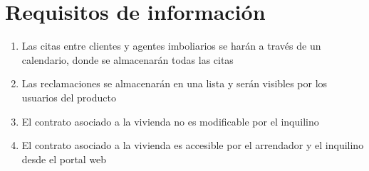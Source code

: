 \section{Requisitos de información}
\begin{enumerate}
\item Las citas entre clientes y agentes imboliarios se harán a través de un calendario, donde se almacenarán todas las citas
\item Las reclamaciones se almacenarán en una lista y serán visibles por los usuarios del producto
\item El contrato asociado a la vivienda no es modificable por el inquilino
\item El contrato asociado a la vivienda es accesible por el arrendador y el inquilino desde el portal web
\end{enumerate}

